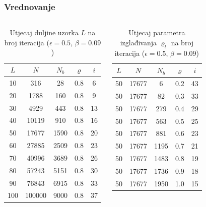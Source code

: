 \documentclass{beamer}
\begin{document}
\begin{frame}[t]
\frametitle{Vrednovanje}
\begin{columns}[t]
  \begin{table}[]
    \caption{Utjecaj duljine uzorka $L$ na broj iteracija ($\epsilon = 0.5$, $\beta = 0.09$)}
    \label{tbl:promjenaL}
    \centering
    \begin{tabular}{c | c | c | c | c}
      $L$ & $N$ & $N_b$ & $\varrho$ & $i$ \\ \hline
      10 & 316 & 28 & 0.8 & 6 \\ \hline
      20 & 1788 & 160 & 0.8 & 9 \\ \hline
      30 & 4929 & 443 & 0.8 & 13 \\ \hline
      40 & 10119 & 910 & 0.8 & 16 \\ \hline
      50 & 17677 & 1590 & 0.8 & 20 \\ \hline
      60 & 27885 & 2509 & 0.8 & 23 \\ \hline
      70 & 40996 & 3689 & 0.8 & 26 \\ \hline
      80 & 57243 & 5151 & 0.8 & 30 \\ \hline
      90 & 76843 & 6915 & 0.8 & 33 \\ \hline
      100 & 100000 & 9000 & 0.8 & 37
    \end{tabular}
  \end{table}
  \begin{table}[]
    \caption{Utjecaj parametra izglađivanja $\varrho_t$ na broj iteracija ($\epsilon = 0.5$, $\beta = 0.09$)}
    \label{tbl:promjenaQ}
    \centering
    \begin{tabular}{c | c | c | c | c}
      $L$ & $N$ & $N_b$ & $\varrho$ & $i$ \\ \hline
      50 & 17677 & 6 & 0.2 & 43 \\ \hline
      50 & 17677 & 82 & 0.3 & 33 \\ \hline
      50 & 17677 & 279 & 0.4 & 29 \\ \hline
      50 & 17677 & 563 & 0.5 & 25 \\ \hline
      50 & 17677 & 881 & 0.6 & 23 \\ \hline
      50 & 17677 & 1195 & 0.7 & 21 \\ \hline
      50 & 17677 & 1483 & 0.8 & 19 \\ \hline
      50 & 17677 & 1736 & 0.9 & 18 \\ \hline
      50 & 17677 & 1950 & 1.0 & 15
    \end{tabular}
  \end{table}
  \end{columns}

\end{frame}
\end{document}
